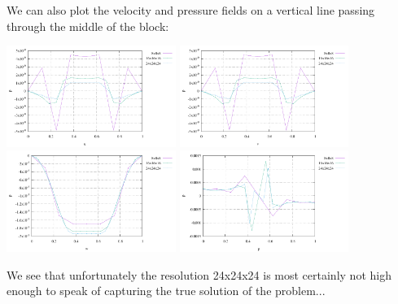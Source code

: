 We can also plot the velocity and pressure fields on a vertical line passing 
through the middle of the block:
\begin{center}
\includegraphics[width=5.5cm]{python_codes/fieldstone_82/results/bench4/vert_u}
\includegraphics[width=5.5cm]{python_codes/fieldstone_82/results/bench4/vert_v}
\includegraphics[width=5.5cm]{python_codes/fieldstone_82/results/bench4/vert_w}
\includegraphics[width=5.5cm]{python_codes/fieldstone_82/results/bench4/vert_p}
\end{center}
We see that unfortunately the resolution 24x24x24 is most certainly not high 
enough to speak of capturing the true solution of the problem...

